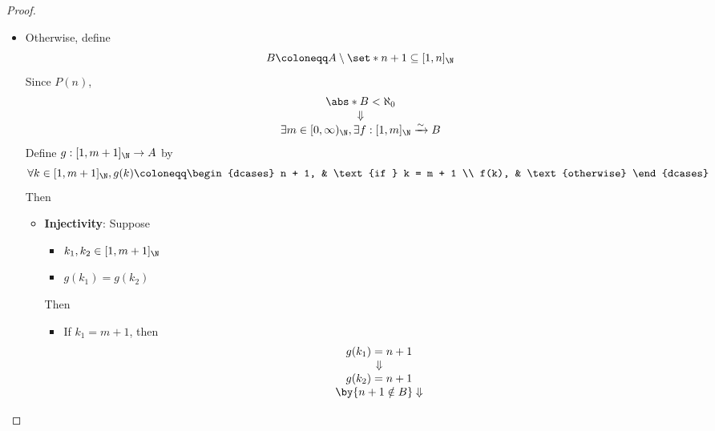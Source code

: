 \begin{proof}
\begin{itemize}
\begin{itemize}
\[\begin{array}{c}
                    \end{array}
                  \]
            \item Otherwise, define
                  \[
                    B \coloneqq A \setminus \set*{n + 1} \subseteq [1, n]_{\N}
                  \]
                  Since $P(n)$,
                  \[
                    \begin{array}{c}
                      \abs*{B} < \aleph_{0} \\
                      \Downarrow            \\
                      \exists m \in [0, \infty)_{\N}, \exists f: [1, m]_{\N} \xrightarrow{\sim} B
                    \end{array}
                  \]
                  Define $g: [1, m + 1]_{\N} \to A$ by
                  \[
                    \forall k \in [1, m + 1]_{\N}, g(k) \coloneqq \begin{dcases}
                      n + 1, & \text{if } k = m + 1 \\
                      f(k),  & \text{otherwise}
                    \end{dcases}
                  \]
                  Then
                  \begin{itemize}
                    \item \textbf{Injectivity}: Suppose
                          \begin{itemize}
                            \item $k_{1}, k_{2} \in [1, m + 1]_{\N}$
                            \item $g(k_{1}) = g(k_{2})$
                          \end{itemize}
                          Then
                          \begin{itemize}
                            \item If $k_{1} = m + 1$, then
                                  \[
                                    \begin{array}{c}
                                      g(k_{1}) = n + 1                            \\
                                      \Downarrow                                  \\
                                      g(k_{2}) = n + 1                            \\
                                      \by{\ensuremath{n + 1 \notin B}} \Downarrow \\

\end{array}\]
\end{itemize}
\end{itemize}
\end{itemize}
\end{itemize}
\end{proof}
